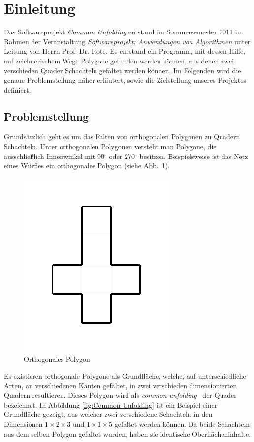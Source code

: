 \section{Einleitung}

Das Softwareprojekt \emph{Common Unfolding} entstand im Sommersemester 2011 im Rahmen der Veranstaltung \emph{Softwareprojekt: Anwendungen von Algorithmen} unter Leitung von Herrn Prof. Dr. Rote. Es entstand ein Programm, mit dessen Hilfe, auf zeichnerischem Wege Polygone gefunden werden können, aus denen zwei verschieden Quader \bzw Schachteln gefaltet werden können. Im Folgenden wird die genaue Problemstellung näher erläutert, sowie die Zielstellung unseres Projektes definiert.


\subsection{Problemstellung}

Grundsätzlich geht es um das Falten von orthogonalen Polygonen zu Quadern \bzw Schachteln. Unter orthogonalen Polygonen versteht man Polygone, die ausschließlich Innenwinkel mit 90$^\circ$ oder 270$^\circ$ besitzen. Beispielsweise ist das Netz eines Würfles ein orthogonales Polygon (siehe Abb.~\ref{fig:polygon}).

\begin{figure}[htbp]
\centering
\includegraphics{03_pics/polygon.pdf}
\caption{Orthogonales Polygon}
\label{fig:polygon}
\end{figure}

Es existieren orthogonale Polygone als Grundfläche, welche, auf unterschiedliche Arten, \dH an verschiedenen Kanten gefaltet, in zwei verschieden dimensionierten Quadern resultieren. Dieses Polygon wird als \emph{common unfolding}~\cite{commonUnfold} der Quader bezeichnet. In Abbildung \ref{fig:Common-Unfolding} ist ein Beispiel einer Grundfläche gezeigt, aus welcher zwei verschiedene Schachteln in den Dimensionen $1\times2\times3$ und $1\times1\times5$ gefaltet werden können. Da beide Schachteln aus dem selben Polygon gefaltet wurden, haben sie identische Oberflächeninhalte.

